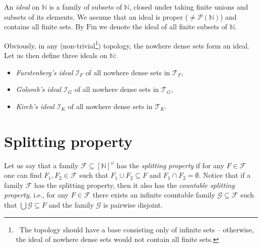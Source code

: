 \documentclass{amsart}
\theoremstyle{definition}
\newcommand{\N}{{\mathbb N}}
\newcommand{\Fin}{\textrm{Fin}}
\newcommand{\I}{\mathcal I}
\newcommand{\T}{\mathcal{T}}
\newcommand{\InfSubs}{[\N]^{\omega}}
\begin{document}
An \emph{ideal} on $\N$ is a family of subsets of $\N$, closed under taking finite unions and subsets of its elements. We assume that an ideal is proper ($\neq \mathcal{P}(\N)$) and contains all finite sets. By $\Fin$ we denote the ideal of all finite subsets of $\N$.

Obviously, in any (non-trivial\footnote{\ The topology should have a base consisting only of 
infinite sets -- otherwise, the ideal of nowhere dense sets would not contain all finite sets.}) topology, the nowhere dense sets form an ideal. Let us then define three ideals on $\N$:
\begin{itemize}
\item \emph{Furstenberg's ideal} $\I_F$ of all nowhere dense sets in $\T_F$,
\item \emph{Golomb's ideal} $\I_G$ of all nowhere dense sets in $\T_G$,
\item \emph{Kirch's ideal} $\I_K$ of all nowhere dense sets in $\T_K$.
\end{itemize}


\section*{Splitting property}

Let us say that a family $\mathcal{F} \subseteq \InfSubs$ has the \emph{splitting property} if for any $F \in \mathcal{F}$ one can find $F_1, F_2 \in \mathcal{F}$ such that $F_1 \cup F_2 \subseteq F$ and $F_1 \cap F_2 = \emptyset$. Notice that if a family $\mathcal{F}$ has the splitting property, then it also has the \emph{countable splitting property}, i.e., for any $F \in \mathcal{F}$ there exists an infinite countable family $\mathcal{G} \subseteq \mathcal{F}$ such that $\bigcup{\mathcal{G}} \subseteq F$ and the family $\mathcal{G}$ is pairwise disjoint.
\end{document}
